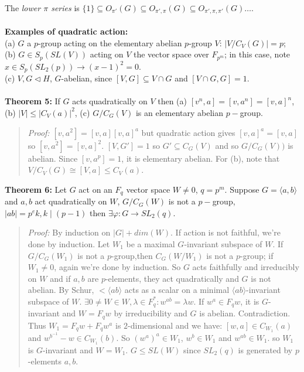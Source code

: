 The \emph{lower $\pi$ series} is
$\{ 1 \} \subseteq O_{\pi'}(G) \subseteq O_{\pi', \pi}(G) \subseteq O_{\pi', \pi, \pi'}(G) \ldots$.
\\
\\
{\bf Examples of quadratic action:} \\
(a) $G$ a $p$-group acting on the elementary abelian $p$-group $V$: $|V/C_V(G)|= p$;\\
(b) $G \in S_p(SL(V))$ acting on $V$ the vector space over $F_{p^m}$; in this case, note $x \in S_p(SL_2(p)) \rightarrow (x-1)^2 = 0$.\\
(c) $V, G \lhd H$, $G$-abelian, since $[V,G] \subseteq V \cap G$ and $[V \cap G, G] = 1$.
\\
\\
{\bf Theorem 5:}
If $G$ acts quadratically on $V$ then (a) $[v^n,a]=[v,a^n]=[v,a]^n$,
(b) $|V| \le |C_V(a)|^2$, (c) $G/C_G(V)$ is an elementary abelian $p-$group.
\begin{quote}
\emph{Proof:}  
$[v,a^2]= [v,a] [v,a]^a$ but quadratic action gives $[v,a]^a= [v,a]$ so
$[v,a^2]= [v,a]^2$.  $[V,G']= 1$ so $G' \subseteq C_G(V)$ and so $G/C_G(V))$ is abelian.
Since $[v, a^p] = 1$, it is elementary abelian.  For (b), note that
$V/C_V(G) \cong [V, a] \le C_V(a)$.
\end{quote}
{\bf Theorem 6:}
Let $G$ act on an $F_q$ vector space $W \ne 0$, $q=p^m$.  Suppose $G= \langle a,b \rangle $ and
$a, b$ act quadratically on $W$, $G/C_G(W)$ is not a $p-$group, $|ab|=p^ek, k \mid (p-1)$
then $\exists \varphi: G \rightarrow SL_2(q)$.  
\begin{quote}
\emph{Proof:}  
By induction on $|G|+ dim(W)$.  If action is not faithful, we're done by induction.
Let $W_1$ be a maximal $G$-invariant subspace of $W$.  If $G/C_G(W_1)$ is not a
$p$-group,then $C_G(W/W_1)$ is not a $p$-group; if $W_1 \ne 0$, again we're done by induction.
So $G$ acts faithfully and irreducibly on $W$ and if $a, b$ 
are $p$-elements, they act quadratically and $G$ is not abelian.
By Schur, $< \langle ab \rangle $ acts as a scalar on a minimal 
$ \langle ab \rangle $-invariant subspace
of $W$.  $\exists 0 \ne W \in W, \lambda \in F_q^*: w^{ab}= \lambda w$.
If $w^a \in F_q w$, it is $G$-invariant and $W= F_qw$ by irreducibility and $G$ is
abelian.  Contradiction.  Thus $W_1 = F_q w + F_q w^a$ is $2$-dimensional and we
have:
$[w,a] \in C_{W_1}(a)$ and
$w^{b^{-1}} -w \in C_{W_1}(b)$.  So $(w^a)^a \in W_1$, $w^b \in W_1$ and $w^{ab} \in W_1$.
so $W_1$  is $G$-invariant and $W= W_1$.  $G \le SL(W)$ since $SL_2(q)$ is generated by
$p$-elements $a, b$.
\end{quote}
